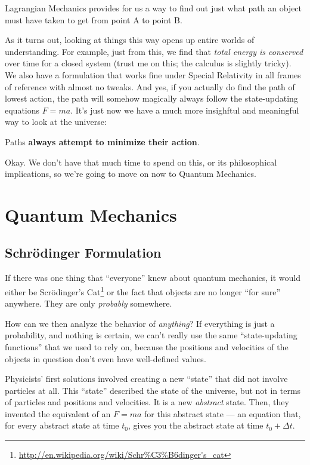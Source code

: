 \documentclass[]{article}
\renewcommand{\href}[2]{#2\footnote{\url{#1}}}
\begin{document}
Lagrangian Mechanics provides for us a way to find out just what path an object must have taken to
get from point A to point B.

As it turns out, looking at things this way opens up entire worlds of understanding. For example,
just from this, we find that \emph{total energy is conserved} over time for a closed system (trust
me on this; the calculus is slightly tricky). We also have a formulation that works fine under
Special Relativity in all frames of reference with almost no tweaks. And yes, if you actually do
find the path of lowest action, the path will somehow magically always follow the state-updating
equations \(F = m a\). It's just now we have a much more insighftul and meaningful way to look at
the universe:

Paths \textbf{always attempt to minimize their action}.

Okay. We don't have that much time to spend on this, or its philosophical implications, so we're
going to move on now to Quantum Mechanics.

\section{Quantum Mechanics}\label{quantum-mechanics}

\subsection{Schrödinger Formulation}\label{schruxf6dinger-formulation}

If there was one thing that ``everyone'' knew about quantum mechanics, it would either be
\href{http://en.wikipedia.org/wiki/Schr\%C3\%B6dinger's_cat}{Scrödinger's Cat} or the fact that
objects are no longer ``for sure'' anywhere. They are only \emph{probably} somewhere.

How can we then analyze the behavior of \emph{anything}? If everything is just a probability, and
nothing is certain, we can't really use the same ``state-updating functions'' that we used to rely
on, because the positions and velocities of the objects in question don't even have well-defined
values.

Physicists' first solutions involved creating a new ``state'' that did not involve particles at all.
This ``state'' described the state of the universe, but not in terms of particles and positions and
velocities. It is a new \emph{abstract} state. Then, they invented the equivalent of an \(F = m a\)
for this abstract state --- an equation that, for every abstract state at time \(t_0\), gives you
the abstract state at time \(t_0 + \Delta t\).
\end{document}
